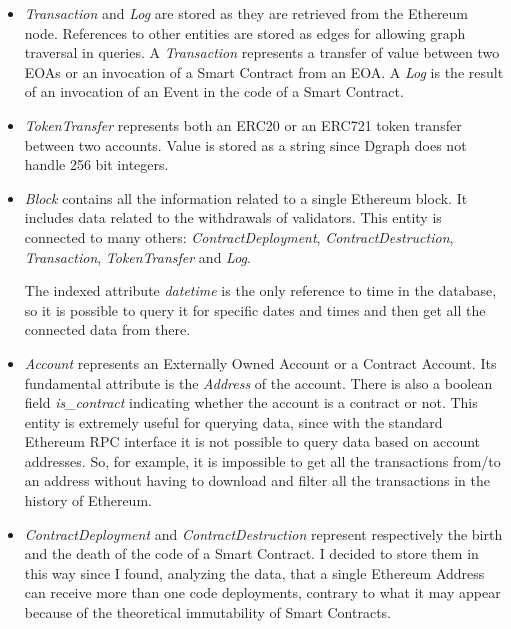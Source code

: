 \begin{itemize}

    \item \textit{Transaction} and \textit{Log} are stored as they are retrieved from the Ethereum node. References to other entities are stored as edges for allowing graph traversal in queries. A \textit{Transaction} represents a transfer of value between two EOAs or an invocation of a Smart Contract from an EOA. A \textit{Log} is the result of an invocation of an Event in the code of a Smart Contract.

    \item \textit{TokenTransfer} represents both an ERC20 or an ERC721 token transfer between two accounts. Value is stored as a string since Dgraph does not handle 256 bit integers.
    
    \item \textit{Block} contains all the information related to a single Ethereum block. It includes data related to the withdrawals of validators. This entity is connected to many others: \textit{ContractDeployment}, \textit{ContractDestruction}, \textit{Transaction}, \textit{TokenTransfer} and \textit{Log}. 
    
    The indexed attribute \textit{datetime} is the only reference to time in the database, so it is possible to query it for specific dates and times and then get all the connected data from there. 

    \item \textit{Account} represents an Externally Owned Account or a Contract Account. Its fundamental attribute is the \textit{Address} of the account. There is also a boolean field \textit{is\_contract} indicating whether the account is a contract or not. This entity is extremely useful for querying data, since with the standard Ethereum RPC interface it is not possible to query data based on account addresses. So, for example, it is impossible to get all the transactions from/to an address without having to download and filter all the transactions in the history of Ethereum.

    \item \textit{ContractDeployment} and \textit{ContractDestruction} represent respectively the birth and the death of the code of a Smart Contract. I decided to store them in this way since I found, analyzing the data, that a single Ethereum Address can receive more than one code deployments, contrary to what it may appear because of the theoretical immutability of Smart Contracts. 


\end{itemize}

